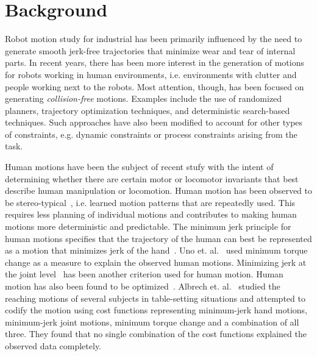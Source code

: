 \documentclass[letterpaper, 10 pt, conference]{ieeeconf}  %
\begin{document}
\section{Background}
\label{sec:background}

Robot motion study for industrial has been primarily influenced by the need to generate smooth jerk-free trajectories that minimize wear and tear of internal parts. In recent years, there has been more interest in the generation of motions for robots working in human environments, i.e. environments with clutter and people working next to the robots. Most attention, though, has been focused on generating {\em collision-free} motions. Examples include the use of randomized planners\cite{kuffner_RRT_icra00}, trajectory optimization techniques\cite{Mrinal:2011}, and deterministic search-based techniques\cite{Cohen:2012}. Such approaches have also been modified to account for other types of constraints, e.g. dynamic constraints or process constraints arising from the task. 

Human motions have been the subject of recent stufy with the intent of determining whether there are certain motor or locomotor invariants that best describe human manipulation or locomotion. Human motion has been observed to be stereo-typical~\cite{Atkeson:85}, i.e. learned motion patterns that are repeatedly used. This requires less planning of individual motions and contributes to making human motions more deterministic and predictable. The minimum jerk principle for human motions specifies that the trajectory of the human can best be represented as a motion that minimizes jerk of the hand~\cite{Flash:85}. Uno et. al.~\cite{Uno:89} used minimum torque change as a measure to explain the observed human motions. Minimizing jerk at the joint level~\cite{Rosenbaum:1995} has been another criterion used for human motion. Human motion has also been found to be optimized~\cite{Arechavaleta:2006}. Albrech et. al.~\cite{Albrecht:2011} studied the reaching motions of several subjects in table-setting situations and attempted to codify the motion using cost functions representing minimum-jerk hand motions, minimum-jerk joint motions, minimum torque change and a combination of all three. They found that no single combination of the cost functions explained the observed data completely. 
\end{document}
